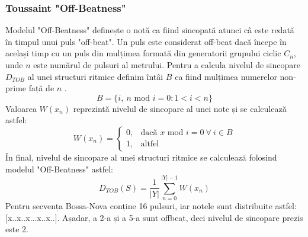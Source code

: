 \subsubsection{Toussaint "Off-Beatness"}
\label{ob}
\noindent Modelul "Off-Beatness" \cite{Toussaint} definește o notă ca fiind sincopată atunci câ este redată în timpul unui puls "off-beat". Un puls este considerat off-beat dacă începe în același timp cu un puls din mulțimea formată din generatorii grupului ciclic $C_{n}$, unde $n$ este numărul de pulsuri al metrului. Pentru a calcula nivelul de sincopare $D_{TOB}$ al unei structuri ritmice definim întâi $B$ ca fiind mulțimea numerelor non-prime față de $n$ .
\begin{equation}
    B = \{i, \: n \text{ mod } i = 0 : 1 < i < n\}
\end{equation}
Valoarea $W(x_n)$ reprezintă nivelul de sincopare al unei note și se calculează astfel:
\begin{equation}
    W(x_n) = 
    \begin{cases}
        0, & \text{dacă $x$ mod } i = 0 \: \forall \: i \in B\\
        1, & \text{altfel}
    \end{cases}
\end{equation}
În final, nivelul de sincopare al unei structuri ritmice se calculează folosind modelul "Off-Beatness" astfel:
\begin{equation}
    D_{TOB}(S) = \frac{1}{|Y|}\sum_{n=0}^{|Y|-1}{W(x_n)}
\end{equation}
Pentru secvența Bossa-Nova conține 16 pulsuri, iar notele sunt distribuite astfel: [x..x..x...x..x..]. Așadar, a 2-a și a 5-a sunt offbeat, deci nivelul de sincopare prezis este 2.

